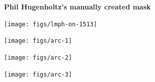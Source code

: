 \documentclass[landscape]{slides}
\begin{document}
\begin{slide}
\begin{center}
\large
\textbf{Phil Hugenholtz's manually created mask}
\end{center}
\small

\begin{center}
\texttt{[image: figs/lmph-on-1513]}

\end{center}
\vfill
\end{slide}
\begin{slide}\begin{center}\texttt{[image: figs/arc-1]}\end{center}\vfill\end{slide}
\begin{slide}\begin{center}\texttt{[image: figs/arc-2]}\end{center}\vfill\end{slide}
\begin{slide}\begin{center}\texttt{[image: figs/arc-3]}\end{center}\vfill\end{slide}
\end{document}
